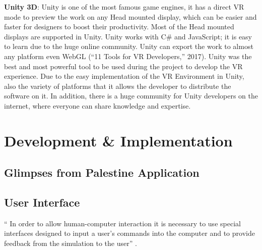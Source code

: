 \textbf{Unity 3D}: Unity is one of the most famous game engines, it has a direct VR mode to preview
the work on any Head mounted display, which can be easier and faster for designers to boost
their productivity. Most of the Head mounted displays are supported in Unity. Unity works
with C\# and JavaScript; it is easy to learn due to the huge online community. Unity can export
the work to almost any platform even WebGL (“11 Tools for VR Developers,” 2017). Unity was
the best and most powerful tool to be used during the project to develop the VR experience.
Due to the easy implementation of the VR Environment in Unity, also the variety of platforms
that it allows the developer to distribute the software on it. In addition, there is a huge
community for Unity developers on the internet, where everyone can share knowledge and
expertise.

\section{Development \& Implementation}



\subsection{Glimpses from Palestine Application}





\subsection{User Interface}

“ In order to allow human-computer interaction it is necessary to use special interfaces designed to input a user's commands into the computer and to provide feedback from the simulation to the user” \citep{burdea2017virtual}.